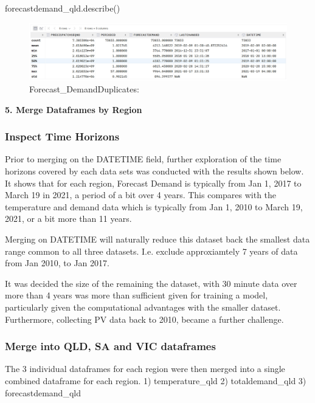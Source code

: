 \documentclass[
]{article}
\newenvironment{Shaded}{}{}
\newcommand{\NormalTok}[1]{#1}
\begin{document}
\begin{Shaded}
\begin{Highlighting}[]
\NormalTok{forecastdemand\_qld.describe()}
\end{Highlighting}
\end{Shaded}

\begin{figure}
\centering
\includegraphics{img/QLD_ForecastDemand_DuplicatesRemoved.jpg}
\caption{Forecast\_DemandDuplicates:}
\end{figure}

\textbf{5. Merge Dataframes by Region}

\subsubsection{Inspect Time Horizons}\label{inspect-time-horizons}

Prior to merging on the DATETIME field, further exploration of the time
horizons covered by each data sets was conducted with the results shown
below. It shows that for each region, Forecast Demand is typically from
Jan 1, 2017 to March 19 in 2021, a period of a bit over 4 years. This
compares with the temperature and demand data which is typically from
Jan 1, 2010 to March 19, 2021, or a bit more than 11 years.

Merging on DATETIME will naturally reduce this dataset back the smallest
data range common to all three datasets. I.e. exclude approxiamtely 7
years of data from Jan 2010, to Jan 2017.

It was decided the size of the remaining the dataset, with 30 minute
data over more than 4 years was more than sufficient given for training
a model, particularly given the computational advantages with the
smaller dataset. Furthermore, collecting PV data back to 2010, became a
further challenge.

\subsubsection{Merge into QLD, SA and VIC
dataframes}\label{merge-into-qld-sa-and-vic-dataframes}

The 3 individual dataframes for each region were then merged into a
single combined dataframe for each region. 1) temperature\_qld 2)
totaldemand\_qld 3) forecastdemand\_qld
\end{document}

